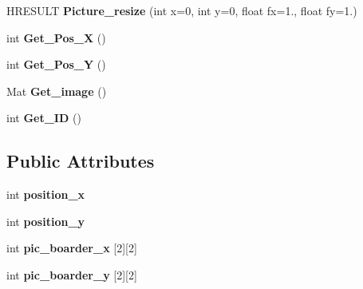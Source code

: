\begin{DoxyCompactItemize}
H\+R\+E\+S\+U\+LT {\bfseries Picture\+\_\+resize} (int x=0, int y=0, float fx=1., float fy=1.)
\item 
\mbox{\label{class_kinect_1_1_picture_a345f40677c097a5af4c652b0131843ec}} 
int {\bfseries Get\+\_\+\+Pos\+\_\+X} ()
\item 
\mbox{\label{class_kinect_1_1_picture_a49c2c244b554ab2eb15b6e6d5c2de938}} 
int {\bfseries Get\+\_\+\+Pos\+\_\+Y} ()
\item 
\mbox{\label{class_kinect_1_1_picture_a8d3af307ab2697fc23b43a68bdc78665}} 
Mat {\bfseries Get\+\_\+image} ()
\item 
\mbox{\label{class_kinect_1_1_picture_acab1b7abeff5d017dbe19f0267213e36}} 
int {\bfseries Get\+\_\+\+ID} ()
\end{DoxyCompactItemize}
\subsection*{Public Attributes}
\begin{DoxyCompactItemize}
\item 
\mbox{\label{class_kinect_1_1_picture_ab9043b19d0e2a3a769d3aeb2fe3a52b9}} 
int {\bfseries position\+\_\+x}
\item 
\mbox{\label{class_kinect_1_1_picture_ae10fd48784d4616d73f0826083e20bf2}} 
int {\bfseries position\+\_\+y}
\item 
\mbox{\label{class_kinect_1_1_picture_a5ef35822bd8cf44e7226cd9a6b780b86}} 
int {\bfseries pic\+\_\+boarder\+\_\+x} \mbox{[}2\mbox{]}\mbox{[}2\mbox{]}
\item 
\mbox{\label{class_kinect_1_1_picture_a77b3a889cbbc1752514c3849e1692478}} 
int {\bfseries pic\+\_\+boarder\+\_\+y} \mbox{[}2\mbox{]}\mbox{[}2\mbox{]}
\end{DoxyCompactItemize}

